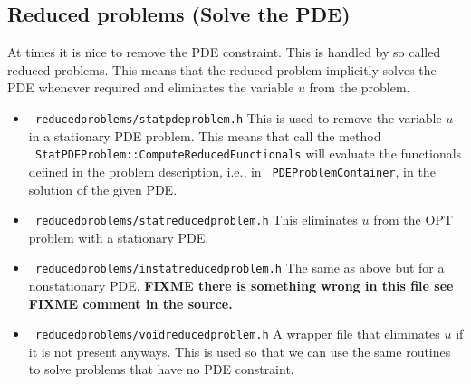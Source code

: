 \subsection{Reduced problems (Solve the PDE)}
At times it is nice to remove the PDE constraint. This is handled by so called reduced 
problems. This means that the reduced problem implicitly solves the PDE whenever required
and eliminates the variable $u$ from the problem.
\begin{itemize}
\item \texttt{ reducedproblems/statpdeproblem.h} This is used to remove the variable $u$ in 
  a stationary PDE problem. This means that call the method \\
  \texttt{ StatPDEProblem::ComputeReducedFunctionals} will evaluate the functionals 
  defined in the problem description, i.e., in \texttt{ PDEProblemContainer}, in the 
  solution of the given PDE.
\item \texttt{ reducedproblems/statreducedproblem.h} This eliminates $u$ from the OPT
  problem with a stationary PDE.
\item \texttt{ reducedproblems/instatreducedproblem.h} The same as above but for a
  nonstationary PDE. {\bf FIXME there is something wrong in this file see FIXME 
    comment in the source.}
\item \texttt{ reducedproblems/voidreducedproblem.h} A wrapper file that eliminates $u$ 
  if it is not present anyways. This is used so that we can use the same routines to 
  solve problems that have no PDE constraint.
\end{itemize}

